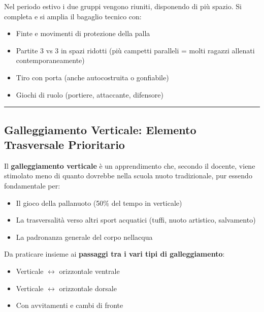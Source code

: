 \documentclass[a4paper,11pt]{article}
\providecommand{\tightlist}{%
  \setlength{\itemsep}{0pt}\setlength{\parskip}{0pt}}
\begin{document}
Nel periodo estivo i due gruppi vengono riuniti, disponendo di più
spazio. Si completa e si amplia il bagaglio tecnico con:

\begin{itemize}
      \tightlist
      \item
            Finte e movimenti di protezione della palla
      \item
            Partite 3 vs 3 in spazi ridotti (più campetti paralleli = molti
            ragazzi allenati contemporaneamente)
      \item
            Tiro con porta (anche autocostruita o gonfiabile)
      \item
            Giochi di ruolo (portiere, attaccante, difensore)
\end{itemize}

\begin{center}\rule{0.5\linewidth}{0.5pt}\end{center}

\subsection{Galleggiamento Verticale: Elemento Trasversale
      Prioritario}\label{galleggiamento-verticale-elemento-trasversale-prioritario}

Il \textbf{galleggiamento verticale} è un apprendimento che, secondo il
docente, viene stimolato meno di quanto dovrebbe nella scuola nuoto
tradizionale, pur essendo fondamentale per:

\begin{itemize}
      \tightlist
      \item
            Il gioco della pallanuoto (50\% del tempo in verticale)
      \item
            La trasversalità verso altri sport acquatici (tuffi, nuoto artistico,
            salvamento)
      \item
            La padronanza generale del corpo nell\textquotesingle acqua
\end{itemize}

Da praticare insieme ai \textbf{passaggi tra i vari tipi di
      galleggiamento}:

\begin{itemize}
      \tightlist
      \item
            Verticale $\leftrightarrow$ orizzontale ventrale
      \item
            Verticale $\leftrightarrow$ orizzontale dorsale
      \item
            Con avvitamenti e cambi di fronte
\end{itemize}
\end{document}
